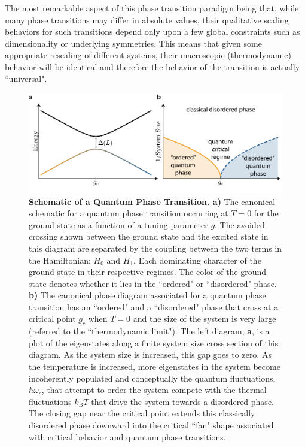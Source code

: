 The most remarkable aspect of this phase transition paradigm being that, while many phase transitions may differ in absolute values, their qualitative scaling behaviors for such transitions depend only upon a few global constraints such as dimensionality or underlying symmetries. This means that given some appropriate rescaling of different systems, their macroscopic (thermodynamic) behavior will be identical and therefore the behavior of the transition is actually ``universal". 

\begin{figure}[t!]
		\includegraphics[width=\columnwidth]{figures/ch3/qptv2edit.pdf} 
		\caption{\textbf{Schematic of a Quantum Phase Transition. a)}  The canonical schematic for a quantum phase transition occurring at $T=0$ for the ground state as a function of a tuning parameter $g$. The avoided crossing shown between the ground state and the excited state in this diagram are separated by the coupling between the two terms in the Hamiltonian:  $H_0$ and $H_1$. Each dominating character of the ground state in their respective regimes. The color of the ground state denotes whether it lies in the ``ordered" or ``disordered" phase. \textbf{b)}  The canonical phase diagram associated for a quantum phase transition has an ``ordered" and a ``disordered" phase that cross at a critical point $g_c$ when $T=0$ and the size of the system is very large (referred to the ``thermodynamic limit"). The left diagram, \textbf{a}, is a plot of the eigenstates along a finite system size cross section of this diagram. As the system size is increased, this gap goes to zero. As the temperature is increased, more eigenstates in the system become incoherently populated and conceptually the quantum fluctuations, $\hbar \omega_c$, that attempt to order the system compete with the thermal fluctuations $k_\text{B} T$ that drive the system towards a disordered phase.  The closing gap near the critical point extends this classically disordered phase downward into the critical ``fan" shape associated with critical behavior and quantum phase transitions.}
		\label{fig:qpt}	
\end{figure}

